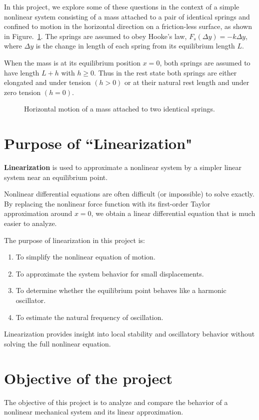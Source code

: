 \documentclass[12pt, a4paper]{report}
\newcommand{\figref}{Figure.~\ref}
\begin{document}
	In this project, we explore some of these questions in the context of a simple nonlinear system consisting of a mass attached to a pair of identical springs and confined to motion in the horizontal direction on a friction-less surface, as shown in \figref{fig:1}. The springs are assumed to obey Hooke's law, $F_s(\Delta y) = -k\Delta y$, where $\Delta y$ is the change in length of each spring from its equilibrium length $L$.
	
	When the mass is at its equilibrium position $x = 0$, both springs are assumed to have length $L + h$ with $h \ge 0$. Thus in the rest state both springs are either elongated and under tension $(h > 0)$ or at their natural rest length and under zero tension $(h = 0)$.
	
	\begin{figure}[hbt!]
		\centering
		
		\caption{Horizontal motion of a mass attached to two identical springs.}
		\label{fig:1}
	\end{figure}
	
	\section{Purpose of ``Linearization"}
	\textbf{Linearization} is used to approximate a nonlinear system by a simpler linear system near an equilibrium point.
	
	Nonlinear differential equations are often difficult (or impossible) to solve exactly. By replacing the nonlinear force function with its first-order Taylor approximation around $x=0$, we obtain a linear differential equation that is much easier to analyze.
	
	The purpose of linearization in this project is:
	\begin{enumerate}
		\item To simplify the nonlinear equation of motion.
		\item To approximate the system behavior for small displacements.
		\item To determine whether the equilibrium point behaves like a harmonic oscillator.
		\item To estimate the natural frequency of oscillation.
	\end{enumerate}
	
	Linearization provides insight into local stability and oscillatory behavior without solving the full nonlinear equation.
	
	\section{Objective of the project}
	The objective of this project is to analyze and compare the behavior of a nonlinear mechanical system and its linear approximation.
	
\end{document}
